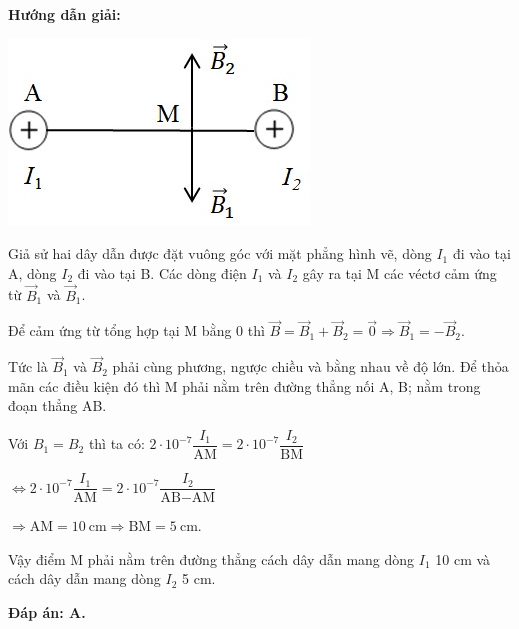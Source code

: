 {\begin{center}
		\textbf{Hướng dẫn giải:}
\end{center}
	\begin{center}
		\includegraphics[scale=0.8]{../figs/VN11-PH-26-L-018-1-h86.jpg}
	\end{center}

Giả sử hai dây dẫn được đặt vuông góc với mặt phẳng hình vẽ, dòng $I_1$ đi vào tại A, dòng $I_2$  đi vào tại B. Các dòng điện $I_1$ và $I_2$ gây ra tại M các véctơ cảm ứng từ $\vec{B}_1$ và $\vec{B}_1$.

Để cảm ứng từ tổng hợp tại M bằng 0 thì $\vec{B}=\vec{B}_1+\vec{B}_2=\vec{0}\Rightarrow \vec{B}_1=-\vec{B}_2 $. 


Tức là $\vec{B}_1$ và $\vec{B}_2$ phải cùng phương, ngược chiều và bằng nhau về độ lớn. Để thỏa mãn các điều kiện đó thì M phải nằm trên đường thẳng nối A, B; nằm trong đoạn thẳng AB.

Với $B_1=B_2$ thì ta có:  $2\cdot 10^{-7}\dfrac{I_1}{\text{AM}}=2\cdot 10^{-7}\dfrac{I_2}{\text{BM}}$

$\Leftrightarrow 2\cdot 10^{-7}\dfrac{I_1}{\text{AM}}=2\cdot 10^{-7}\dfrac{I_2}{\text{AB}-\text{AM}}$

$\Rightarrow \text{AM}=\text{10}\ \text{cm}\Rightarrow \text{BM}=\text{5}\ \text{cm}$.

Vậy điểm M phải nằm trên đường thẳng cách dây dẫn mang dòng $I_1$ 10 cm và cách dây dẫn mang dòng $I_2$ 5 cm.

\textbf{	Đáp án: A.}

}
